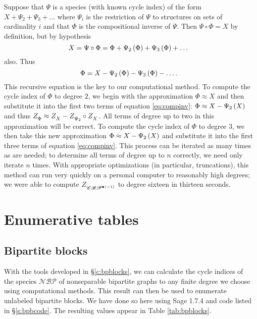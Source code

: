 \documentclass[distribution,draft]{brandiss} %
\numberwithin{section}{chapter}
\numberwithin{figure}{chapter}
\begin{document}
Suppose that $\Psi$ is a species (with known cycle index) of the form $X + \Psi_{2} + \Psi_{3} + \dots$ where $\Psi_{i}$ is the restriction of $\Psi$ to structures on sets of cardinality $i$ and that $\Phi$ is the compositional inverse of $\Psi$.
Then $\Psi \circ \Phi = X$ by definition, but by hypothesis
\begin{equation*}
  X = \Psi \circ \Phi = \Phi + \Psi_{2} \left( {\Phi} \right) + \Psi_{3} \left( {\Phi} \right) + \dots
\end{equation*}
also. Thus
\begin{equation}
  \label{eq:compinv}
  \Phi = X - \Psi_{2} \left( {\Phi} \right) - \Psi_{3} \left( {\Phi} \right) - \dots.
\end{equation}
This recursive equation is the key to our computational method.
To compute the cycle index of $\Phi$ to degree $2$, we begin with the approximation $\Phi \approx X$ and then substitute it into the first two terms of equation \eqref{eq:compinv}: $\Phi \approx X - \Psi_{2} \left( {X} \right)$ and thus $ Z_{\Phi}^{}  \approx  Z_{X}^{}  -  Z_{\Psi_{2}}^{}  \circ  Z_{X}^{} $.
All terms of degree up to two in this approximation will be correct.
To compute the cycle index of $\Phi$ to degree $3$, we then take this new approximation $\Phi \approx X - \Psi_{2} \left( {X} \right)$ and substitute it into the first three terms of equation \eqref{eq:compinv}.
This process can be iterated as many times as are needed; to determine all terms of degree up to $n$ correctly, we need only iterate $n$ times.
With appropriate optimizations (in particular, truncations), this method can run very quickly on a personal computer to reasonably high degrees; we were able to compute $ Z_{\mathscr{CBP}^{\bullet \left\langle {-1} \right\rangle}}^{} $ to degree sixteen in thirteen seconds.

\chapter{Enumerative tables}\label{c:enum}
\section{Bipartite blocks}\label{s:bpenum}
With the tools developed in \S \ref{c:bpblocks}, we can calculate the cycle indices of the species $\mathcal{NBP}$ of nonseparable bipartite graphs to any finite degree we choose using computational methods.
This result can then be used to enumerate unlabeled bipartite blocks.
We have done so here using Sage 1.7.4 \cite{sage} and code listed in \S \ref{s:bpbcode}.
The resulting values appear in Table \ref{tab:bpblocks}.
\end{document}

